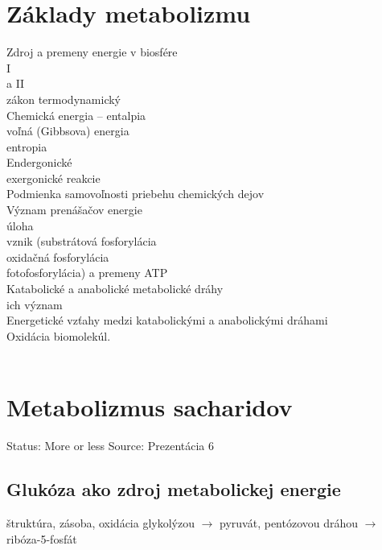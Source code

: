 \section{Základy metabolizmu}
Zdroj a premeny energie v biosfére\\
I\\
a II\\
zákon termodynamický\\
Chemická energia -- entalpia\\
\tab voľná (Gibbsova) energia\\
\tab entropia\\
Endergonické\\
\tab exergonické reakcie\\
Podmienka samovoľnosti priebehu chemických dejov\\
Význam prenášačov energie\\
\tab úloha\\
\tab vznik (substrátová fosforylácia\\
\tab oxidačná fosforylácia\\
\tab fotofosforylácia) a premeny ATP\\
Katabolické a anabolické metabolické dráhy\\
\tab ich význam\\
Energetické vzťahy medzi katabolickými a anabolickými dráhami\\
Oxidácia biomolekúl.\\
\\
\section{Metabolizmus sacharidov}

Status: More or less
Source: Prezentácia 6

\subsection*{Glukóza ako zdroj metabolickej energie}
štruktúra, zásoba, oxidácia glykolýzou $\rightarrow$ pyruvát, pentózovou dráhou $\rightarrow$ ribóza-5-fosfát\\
